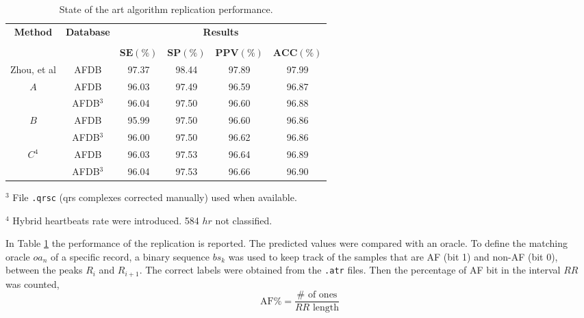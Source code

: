 \begin{table}[h]
\begin{center}
\begin{threeparttable}
\caption[State of the art algorithm replication performance.]{State of the art algorithm replication performance.}
\label{table:zhou_hr_and_unimol}
\scriptsize
  \begin{tabular}{c c c c c c}
  \toprule
  \textbf{Method} & \textbf{Database} & \multicolumn{4}{c}{\textbf{Results}} \\
  \cline{3-6}
  \\
  & & $\mathbf{SE(\%)}$ & $\mathbf{SP(\%)}$ & $\mathbf{PPV(\%)}$ & $\mathbf{ACC(\%)}$\\
  \midrule  
  Zhou, et al\cite{zhou2015} & AFDB & 97.37 & 98.44 & 97.89 & 97.99 \\
  \hline
  $A$ & AFDB & 96.03 & 97.49 & 96.59 & 96.87 \\
  & AFDB$^3$ & 96.04 & 97.50 & 96.60 & 96.88 \\
  \hline
  $B$ & AFDB & 95.99 & 97.50 & 96.60 & 96.86 \\
  & AFDB$^3$ & 96.00 & 97.50 & 96.62 & 96.86 \\
  \hline
  $C^4$ & AFDB & 96.03 & 97.53 & 96.64 & 96.89 \\
  & AFDB$^3$ & 96.04 & 97.53 & 96.66 & 96.90 \\
  \bottomrule
\end{tabular}
\begin{tablenotes}
 	\item $^3$ File \verb|.qrsc| (qrs complexes corrected manually) used when available.
 	\item $^4$ Hybrid heartbeats rate were introduced. 584 $hr$ not classified.
    \end{tablenotes}
\end{threeparttable}
\end{center}
\end{table}
In Table \ref{table:zhou_hr_and_unimol} the performance of the replication is reported. The predicted values were compared with an oracle. To define the matching oracle $oa_n$ of a specific record, a binary sequence $bs_k$ was used to keep track of the samples that are AF (bit 1) and non-AF (bit 0), between the peaks $R_i$ and $R_{i+1}$. The correct labels were obtained from the \verb|.atr| files. Then the percentage of AF bit in the interval $RR$ was counted,
\begin{equation}
 \text{AF\%} = \frac{\# \text{ of ones}}{RR \text{ length}}
\end{equation}
